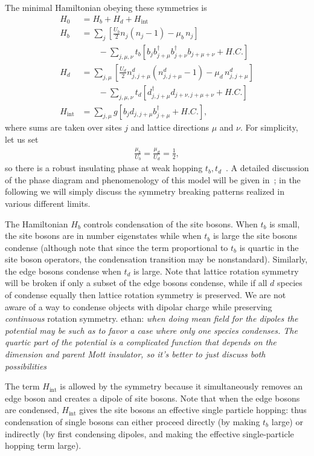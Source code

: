 \documentclass[pra,aps,twocolumn, amsfonts,amsmath,amssymb,nofootinbib,superscriptaddress]{revtex4-2}
\newcommand{\charlie}[1]{\textcolor{Blue}{#1}}
\newcommand{\nn}{\nonumber\\}
\newcommand{\ethan}[1]{ { \color{blue} \footnotesize \textsf{ethan: \textsl{#1}} }}
\begin{document}
The minimal Hamiltonian obeying these symmetries is  
\begin{align}
H_0  &= H_b + H_d + H_\text{int}\nn
H_b &= \sum_j \left[ \frac{U_b}{2}  n_j (n_j-1) - \mu_b \, n_j \right] \nn
&\qquad - \sum_{j,\mu,\nu} t_b \left[  b_j b^{\dag}_{j+\mu} b^{\dag}_{j+\nu} b_{j+\mu+\nu} + H.C. \right]\nn
H_d &= \sum_{j,\mu} \left[ \frac{U_d}{2} n^d_{j,j+\mu} (n^d_{j,j+\mu} - 1) -\mu_d \, n^d_{j, j + \mu} \right]\nn
&\qquad  - \sum_{j,\mu,\nu} t_d \left[d^{\dag}_{j, j + \mu} d_{j + \nu, j+\mu + \nu} +H.C.\right]\nn
H_\text{int} &= \sum_{j,\mu} g\left[ b_j d_{j,j+\mu} b^\dag_{j+\mu} + H.C. \right],
\end{align}
where sums are taken over sites $j$ and lattice directions $\mu$ and $\nu$.  
For simplicity, let us set 
\begin{align}
\frac{\mu_b}{ U_b} = \frac{\mu_d }{ U_d} = \frac{1}{2},
\end{align}
so there is a robust insulating phase at weak hopping $t_b, t_d$~\cite{Fisheretal}. A detailed discussion of the phase diagram and phenomenology of this model will be given in~\cite{dbhm}; in the following we will simply discuss the symmetry breaking patterns realized in various different limits. 

The Hamiltonian $H_b$ controls condensation of the site bosons. When $t_b$ is small, the site bosons are in number eigenstates while when $t_b$ is large the site bosons condense (although note that since the term proportional to $t_b$ is quartic in the site boson operators, the condensation transition may be nonstandard). Similarly, the edge bosons condense when $t_d$ is large. Note that lattice rotation symmetry will be broken if only a subset of the edge bosons condense, while if all $d$ species of condense equally then lattice rotation symmetry is preserved. We are not aware of a way to condense objects with dipolar charge while preserving {\it continuous} rotation symmetry. \ethan{when doing mean field for the dipoles the potential may be such as to favor a case where only one species condenses. The quartic part of the potential is a complicated function that depends on the dimension and parent Mott insulator, so it's better to just discuss both possibilities} 

The term $H_\text{int}$ is allowed by the symmetry because it simultaneously removes an edge boson and creates a dipole of site bosons. Note that when the edge bosons are condensed, $H_\text{int}$ gives the site bosons an effective single particle hopping: thus condensation of single bosons can either proceed directly (by making $t_b$ large) or indirectly (by first condensing dipoles, and making the effective single-particle hopping term large). 
\end{document}
